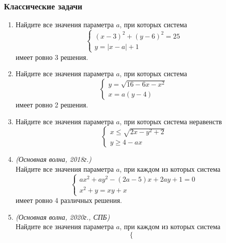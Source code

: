 \documentclass[12pt]{article}
\begin{document}
\subsubsection*{Классические задачи}
 \begin{enumerate}[start=1,label={\itshape\bfseries \arabic*.}]
    \item Найдите все значения параметра $a$, при которых система
    \begin{equation*}
    \begin{cases}
    (x - 3)^2 + (y - 6)^2 = 25\\
    y = |x - a| + 1
    \end{cases}
    \end{equation*}
    имеет ровно 3 решения.
    \item Найдите все значения параметра $a$, при которых система
    \begin{equation*}
        \begin{cases}
            y = \sqrt{16 - 6x - x^2}\\
            x = a(y - 4)
        \end{cases}
    \end{equation*}
    имеет ровно 2 решения.
    \item Найдите все значения параметра $a$, при которых система неравенств
    \begin{equation*}
        \begin{cases}
            x \le \sqrt{2x - y^2 + 2}\\
            y \ge 4 - ax
        \end{cases}
    \end{equation*}
    \item \textit{(Основная волна, 2018г.)}\\
    Найдите все значения параметра $a$, при каждом из которых система
    \begin{equation*}
        \begin{cases}
            ax^2 + ay^2 - (2a - 5)x + 2ay + 1 = 0\\
            x^2 + y = xy + x
        \end{cases}
    \end{equation*}
    имеет ровно 4 различных решения.
    \item \textit{(Основная волна, 2020г., СПБ)}\\
    Найдите все значения параметра $a$, при каждом из которых система
    \begin{equation*}
        \begin{cases}

\end{cases}
\end{equation*}
\end{enumerate}
\end{document}
